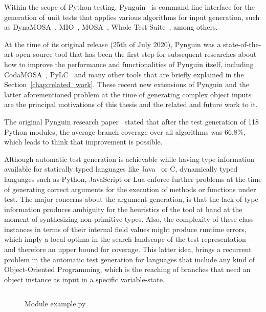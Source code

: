 \documentclass[%
  chapterprefix=false,%
  open=right,%
  twoside=true,%
  paper=a4,%
  logofile={Figures/logo.png},%
  thesistype=master,%
  UKenglish,%
]{se2thesis}
\begin{document}
Within the scope of Python testing, Pynguin~\cite{DBLP:conf/icse/LukasczykF22} is command line interface for the generation of unit tests that applies various algorithms for input generation, such as DynaMOSA~\cite{DBLP:journals/tse/PanichellaKT18}, MIO~\cite{DBLP:conf/ssbse/Arcuri17}, MOSA~\cite{DBLP:conf/icst/PanichellaKT15}, Whole Test Suite~\cite{DBLP:journals/tse/FraserA13}, among others.

At the time of its original release (25th of July 2020), Pynguin was a state-of-the-art open source tool that has been the first step for subsequent researches about how to improve the performance and functionalities of Pynguin itself, including CodaMOSA~\cite{DBLP:conf/icse/LemieuxILS23}, PyLC~\cite{DBLP:conf/sac/SalariEAS23} and many other tools that are briefly explained in the Section~\ref{chap:related_work}.
These recent new extensions of Pynguin and the latter aforementioned problem at the time of generating complex object inputs are the principal motivations of this thesis and the related and future work to it.

The original Pynguin research paper~\cite{DBLP:conf/icse/LukasczykF22} stated that after the test generation of 118 Python modules, the average branch coverage over all algorithms was $66.8\%$, which leads to think that improvement is possible.

Although automatic test generation is achievable while having type information available for statically typed languages like Java~\cite{DBLP:journals/tse/FraserA13} or C, dynamically typed languages such as Python, JavaScript or Lua enforce further problems at the time of generating correct arguments for the execution of methods or functions under test.
The major concerns about the argument generation, is that the lack of type information produces ambiguity for the heuristics of the tool at hand at the moment of synthesizing non-primitive types.
Also, the complexity of these class instances in terms of their internal field values might produce runtime errors, which imply a local optima in the search landscape of the test representation~\cite{DBLP:conf/sigsoft/0001O00D21} and therefore an upper bound for coverage.
This latter idea, brings a recurrent problem in the automatic test generation for languages that include any kind of Object-Oriented Programming, which is the reaching of branches that need an object instance as input in a specific variable-state.

\begin{figure}
  \inputminted[linenos]{python}{Figures/example.py}
  \caption{Module example.py\label{lst:1}}
\end{figure}
\end{document}
